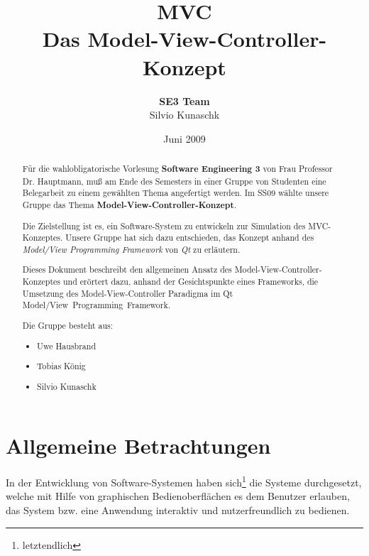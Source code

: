 \documentclass[11pt,a4paper,titlepage]{scrreprt}
\begin{document}
\selectlanguage{\german}

\title{{\Huge \bf MVC}\\[0.55em]{\LARGE Das Model-View-Controller-Konzept}}
\author{{\bf SE3 Team}\\Silvio Kunaschk}

\date{Juni 2009}
\maketitle

\begin{abstract}
Für die wahlobligatorische Vorlesung {\bf Software Engineering 3} von
Frau Professor Dr. Hauptmann, muß am Ende des Semesters in einer 
Gruppe von Studenten eine Belegarbeit zu einem gewählten Thema
angefertigt werden. Im SS09 wählte unsere Gruppe das Thema
{\bf Model-View-Controller-Konzept}.\\{\smallskip}

Die Zielstellung ist es, ein Software-System zu entwickeln zur Simulation
des MVC-Konzeptes. Unsere Gruppe hat sich dazu entschieden, das Konzept
anhand des {\itshape Model/View Programming Framework} von {\itshape Qt}
zu erläutern.\\{\smallskip}

Dieses Dokument beschreibt den allgemeinen Ansatz des 
Model-View-Controller-Konzeptes und erörtert dazu, anhand der Gesichtspunkte
eines Frameworks, die Umsetzung des Model-View-Controller Paradigma im
Qt Model/View~Programming~Framework.\\{\bigskip}

Die Gruppe besteht aus:
\begin{itemize}
\item Uwe Hausbrand
\item Tobias König
\item Silvio Kunaschk
\end{itemize}

\end{abstract}

\tableofcontents

\chapter{Allgemeine Betrachtungen}
In der Entwicklung von Software-Systemen haben sich\footnote{letztendlich} die Systeme durchgesetzt, 
welche mit Hilfe von graphischen Bedienoberflächen es dem Benutzer erlauben, das System
bzw. eine Anwendung interaktiv und nutzerfreundlich zu bedienen.
\end{document}
